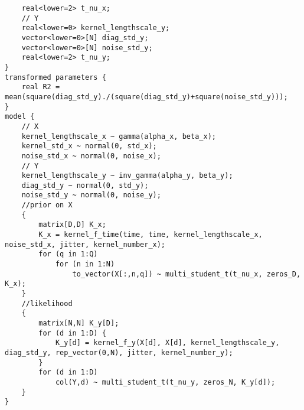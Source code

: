 \begin{lstlisting}
	real<lower=2> t_nu_x;
	// Y
	real<lower=0> kernel_lengthscale_y;
	vector<lower=0>[N] diag_std_y;
	vector<lower=0>[N] noise_std_y;
	real<lower=2> t_nu_y;
}
transformed parameters {
	real R2 = mean(square(diag_std_y)./(square(diag_std_y)+square(noise_std_y)));
}
model {
	// X
	kernel_lengthscale_x ~ gamma(alpha_x, beta_x);
	kernel_std_x ~ normal(0, std_x);
	noise_std_x ~ normal(0, noise_x);
	// Y
	kernel_lengthscale_y ~ inv_gamma(alpha_y, beta_y);
	diag_std_y ~ normal(0, std_y);
	noise_std_y ~ normal(0, noise_y);
	//prior on X
	{
		matrix[D,D] K_x;
		K_x = kernel_f_time(time, time, kernel_lengthscale_x, noise_std_x, jitter, kernel_number_x);
		for (q in 1:Q)
			for (n in 1:N)
				to_vector(X[:,n,q]) ~ multi_student_t(t_nu_x, zeros_D, K_x);
	}
	//likelihood
	{
		matrix[N,N] K_y[D];
		for (d in 1:D) {
			K_y[d] = kernel_f_y(X[d], X[d], kernel_lengthscale_y, diag_std_y, rep_vector(0,N), jitter, kernel_number_y);
		}
		for (d in 1:D) 
			col(Y,d) ~ multi_student_t(t_nu_y, zeros_N, K_y[d]);
	}
}
\end{lstlisting}
\cleardoubleoddpage